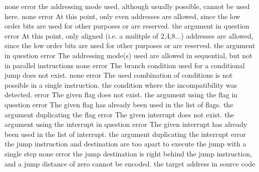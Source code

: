 \documentclass[12pt,twoside]{report}
\begin{document}
\begin{description}
               {none}
               {error}
               {the addressing mode used, although usually possible,
                cannot be used here.}
               {none}
               {error}
               {At this point, only even addresses are allowed, since the
                low order bits are used for other purposes or are reserved.}
               {the argument in question}
               {error}
               {At this point, only aligned (i.e. a mulitple of 2,4,8...) addresses
                are allowed, since the low order bits are used for other purposes
                or are reserved.}
               {the argument in question}
               {error}
               {The addressing mode(s) used are allowed in sequential,
                but not in parallel instructions}
               {none}
               {error}
               {The branch condition used for a conditional jump does not
                exist.}
               {none}
               {error}
               {The used combination of conditions is not possible
                in a single instruction.}
               {the condition where the incompatibility was detected.}
               {error}
               {The given flag does not exist.}
               {the argument using the flag in question}
               {error}
               {The given flag has already been used in the list of flags.}
               {the argument duplicating the flag}
               {error}
               {The given interrupt does not exist.}
               {the argument using the interrupt in question}
               {error}
               {The given interrupt has already been used in the list of interrupt.}
               {the argument duplicating the interrupt}
               {error}
               {the jump instruction and destination are too apart to
                execute the jump with a single step}
               {none}
               {error}
               {the jump destination is right behind the jump instruction,
                and a jump distance of zero cannot be encoded.}
               {the target address in source code}

\end{description}
\end{document}
